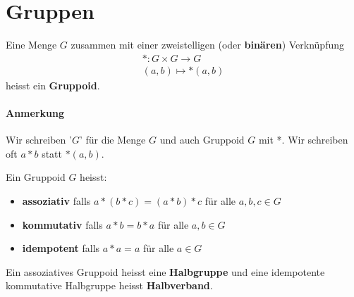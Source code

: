 \documentclass[11pt]{report}
\newcommand*\f[1] {\textbf{#1}}
\begin{document}
\section{Gruppen}
Eine Menge $G$ zusammen mit einer zweistelligen (oder \f{binären}) Verknüpfung
\begin{align}
 *: G \times G \rightarrow G \\
 (a, b) \mapsto *(a,b)
\end{align}
heisst ein \f{Gruppoid}.

\paragraph{Anmerkung}
Wir schreiben '$G$' für die Menge $G$ und auch Gruppoid $G$ mit *. Wir schreiben oft $a*b$ statt $*(a, b)$.

Ein Gruppoid $G$ heisst:
\begin{itemize}
 \item \f{assoziativ} falls $a*(b*c) = (a*b)*c$ für alle $a, b, c \in G$
 \item \f{kommutativ} falls $a*b=b*a$ für alle $a, b \in G$
 \item \f{idempotent} falls $a*a=a$ für alle $a \in G$
\end{itemize}
Ein assoziatives Gruppoid heisst eine \f{Halbgruppe} und eine idempotente kommutative Halbgruppe heisst \f{Halbverband}. 
\end{document}
